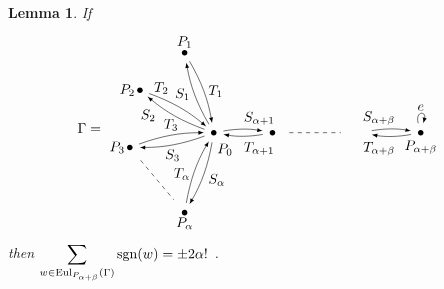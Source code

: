\documentclass{amsproc}
\newtheorem{lemma}[theorem]{Lemma}
\theoremstyle{definition}
\theoremstyle{remark}
\numberwithin{equation}{section}
\newcommand{\sgn}{{\rm sgn}}
\newcommand{\nodeDist}{2}
\newcommand{\uni}{{\rm Eul}}
\begin{document}
\begin{lemma}\label{Eulerian_sum_2}
If
\[\Gamma=
\begin{tikzpicture}[baseline,vertex/.style={anchor=base, circle, fill,minimum size=4pt, inner sep=0pt, outer sep=0pt},auto,
                               edge/.style={->,>=latex, shorten > = 5pt,shorten < = 5pt},
position/.style args={#1:#2 from #3}{
    at=(#3.#1), anchor=#1+180, shift=(#1:#2)
}]

  \node[vertex] (v0) {};
  \node[vertex,position = 0:{\nodeDist*2/3} from v0] (va1) {};
  \node[position = 0:{\nodeDist} from va1] (va2) {};
  \node[vertex,position = 0:{\nodeDist*2/3} from va2] (va3) {};
  \node[vertex,position = 110:{\nodeDist} from v0] (v1L) {};
  \node[vertex,position = 150:{\nodeDist} from v0] (v2L) {};
  \node[vertex,position = 190:{\nodeDist} from v0] (v3L) {};
  \node[vertex,position = 250:{\nodeDist} from v0] (v4L) {};

  \draw (v0) node[below=12, right=-1] {$P_0$};
  \draw (va3) node[below=2] {$P_{\alpha+\beta}$};
  \draw (v1L) node[above] {$P_{1}$};
  \draw (v2L) node[left] {$P_{2}$};
  \draw (v3L) node[left] {$P_{3}$};
  \draw (v4L) node[below] {$P_{\alpha}$};

  \draw[edge] (va3) to [loop above] node[above] {$e$} (va3);

  \draw[edge] (v0) to [bend left=10] node[above=8, right=-3] {$S_{\alpha+1}$} (va1);
  \draw[edge] (va1) to [bend left=10] node[below=9, right=-3] {$T_{\alpha+1}$} (v0);

  \draw[dashed,shorten > = 10pt, shorten < = 10pt, bend right=10] (va1) -- (va2);

  \draw[edge] (va2) to [bend left=10] node[above=8, left=-6] {$S_{\alpha+\beta}$} (va3);
  \draw[edge] (va3) to [bend left=10] node[below=9, left=-6] {$T_{\alpha+\beta}$} (va2);

  \draw[edge] (v0) to [bend left=10] node[left] {$S_{1}$} (v1L);
  \draw[edge] (v1L) to [bend left=10] node[right] {$T_{1}$} (v0);

  \draw[edge] (v0) to [bend left=10] node[left = 10] {$S_{2}$} (v2L);
  \draw[edge] (v2L) to [bend left=10] node[above = 14, left = 4] {$T_{2}$} (v0);

  \draw[edge] (v0) to [bend left=10] node[below] {$S_{3}$} (v3L);
  \draw[edge] (v3L) to [bend left=10] node[above] {$T_{3}$} (v0);

  \draw[dashed,shorten > = 10pt, shorten < = 10pt, bend right=10] (v3L) -- (v4L);

  \draw[edge] (v0) to [bend left=10] node[below = 4, right] {$S_{\alpha}$} (v4L);
  \draw[edge] (v4L) to [bend left=10] node[below=2, left] {$T_{\alpha}$} (v0);
\end{tikzpicture}
\]
then
$\displaystyle \sum_{w\in \uni_{P_{\alpha+\beta}}(\Gamma)}\sgn(w)=\pm 2\alpha ! $ .
\end{lemma}
\end{document}
